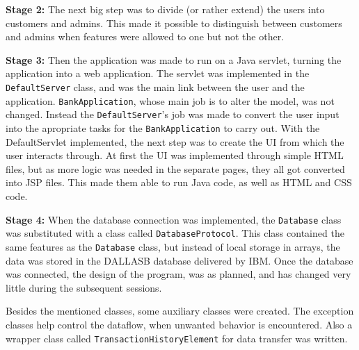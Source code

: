 \textbf{Stage 2:} The next big step was to divide (or rather extend) the users into customers and admins. This made it possible to distinguish between customers and admins when features were allowed to one but not the other.

\textbf{Stage 3:} Then the application was made to run on a Java servlet, turning the application into a web application. The servlet was implemented in the \texttt{DefaultServer} class, and was the main link between the user and the application. \texttt{BankApplication}, whose main job is to alter the model, was not changed. Instead the \texttt{DefaultServer}'s job was made to convert the user input into the apropriate tasks for the \texttt{BankApplication} to carry out. With the DefaultServlet implemented, the next step was to create the UI from which the user interacts through. At first the UI was implemented through simple HTML files, but as more logic was needed in the separate pages, they all got converted into JSP files. This made them able to run Java code, as well as HTML and CSS code. 

\textbf{Stage 4:} When the database connection was implemented, the \texttt{Database} class was substituted with a class called \texttt{DatabaseProtocol}. This class contained the same features as the \texttt{Database} class, but instead of local storage in arrays, the data was stored in the DALLASB database delivered by IBM. Once the database was connected, the design of the program, was as planned, and has changed very little during the subsequent sessions. 

Besides the mentioned classes, some auxiliary classes were created. The exception classes help control the dataflow, when unwanted behavior is encountered. Also a wrapper class called \texttt{TransactionHistoryElement} for data transfer was written.